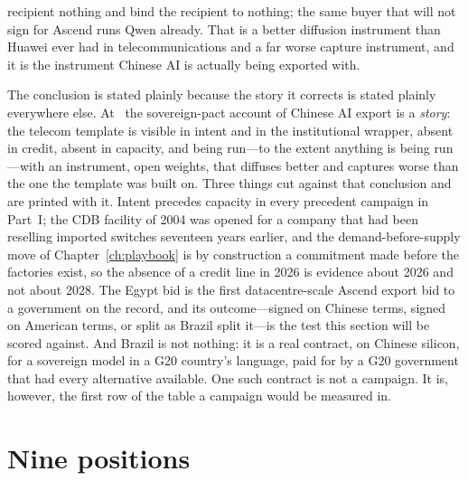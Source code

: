recipient nothing and bind the recipient to nothing; the same buyer that will not sign for Ascend runs Qwen already. That is a better diffusion instrument than Huawei ever had in telecommunications and a far worse capture instrument, and it is the instrument Chinese AI is actually being exported with.

The conclusion is stated plainly because the story it corrects is stated plainly everywhere else. At \datafreeze\ the sovereign-pact account of Chinese AI export is a \emph{story}: the telecom template is visible in intent and in the institutional wrapper, absent in credit, absent in capacity, and being run---to the extent anything is being run---with an instrument, open weights, that diffuses better and captures worse than the one the template was built on. Three things cut against that conclusion and are printed with it. Intent precedes capacity in every precedent campaign in Part~I; the CDB facility of 2004 was opened for a company that had been reselling imported switches seventeen years earlier, and the demand-before-supply move of Chapter~\ref{ch:playbook} is by construction a commitment made before the factories exist, so the absence of a credit line in 2026 is evidence about 2026 and not about 2028. The Egypt bid is the first datacentre-scale Ascend export bid to a government on the record, and its outcome---signed on Chinese terms, signed on American terms, or split as Brazil split it---is the test this section will be scored against. And Brazil is not nothing: it is a real contract, on Chinese silicon, for a sovereign model in a G20 country's language, paid for by a G20 government that had every alternative available. One such contract is not a campaign. It is, however, the first row of the table a campaign would be measured in.

\section{Nine positions}

